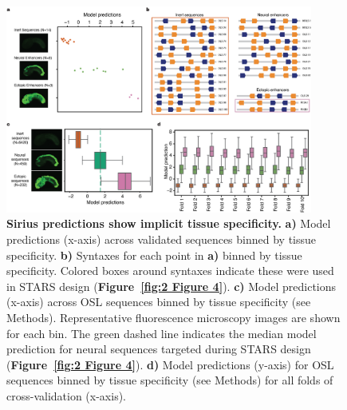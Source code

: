 \begin{figure}[p]
    \centering
    \includegraphics[width=0.9\textwidth]{2_figures-and-files/SuppFig10.png}
    \caption[Sirius predictions show implicit tissue specificity.]{\textbf{Sirius predictions show implicit tissue specificity.} \textbf{a)} Model predictions (x-axis) across validated sequences binned by tissue specificity. \textbf{b)} Syntaxes for each point in \textbf{a)} binned by tissue specificity. Colored boxes around syntaxes indicate these were used in STARS design (\textbf{Figure~\ref{fig:2 Figure 4}}). \textbf{c)} Model predictions (x-axis) across OSL sequences binned by tissue specificity (see Methods). Representative fluorescence microscopy images are shown for each bin. The green dashed line indicates the median model prediction for neural sequences targeted during STARS design (\textbf{Figure~\ref{fig:2 Figure 4}}). \textbf{d)} Model predictions (y-axis) for OSL sequences binned by tissue specificity (see Methods) for all folds of cross-validation (x-axis).}
    \label{fig:supplementary_10}
\end{figure}

